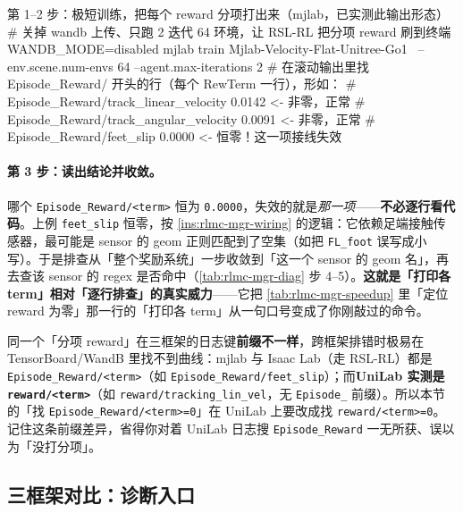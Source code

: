 \begin{codebox}[bash]{第 1--2 步：极短训练，把每个 reward 分项打出来（mjlab，已实测此输出形态）}
# 关掉 wandb 上传、只跑 2 迭代 64 环境，让 RSL-RL 把分项 reward 刷到终端
WANDB_MODE=disabled mjlab train Mjlab-Velocity-Flat-Unitree-Go1 \
    --env.scene.num-envs 64 --agent.max-iterations 2
# 在滚动输出里找 Episode_Reward/ 开头的行（每个 RewTerm 一行），形如：
#   Episode_Reward/track_linear_velocity   0.0142     <- 非零，正常
#   Episode_Reward/track_angular_velocity  0.0091     <- 非零，正常
#   Episode_Reward/feet_slip               0.0000     <- 恒零！这一项接线失效
\end{codebox}

\paragraph{第 3 步：读出结论并收敛。}哪个 \verb|Episode_Reward/<term>| 恒为 \verb|0.0000|，失效的就是\emph{那一项}——\textbf{不必逐行看代码}。上例 \verb|feet_slip| 恒零，按 \cref{ins:rlmc-mgr-wiring} 的逻辑：它依赖足端接触传感器，最可能是 sensor 的 geom 正则匹配到了空集（如把 \verb|FL_foot| 误写成小写）。于是排查从「整个奖励系统」一步收敛到「这一个 sensor 的 geom 名」，再去查该 sensor 的 regex 是否命中（\cref{tab:rlmc-mgr-diag} 步 4--5）。\textbf{这就是「打印各 term」相对「逐行排查」的真实威力}——它把 \cref{tab:rlmc-mgr-speedup} 里「定位 reward 为零」那一行的「打印各 term」从一句口号变成了你刚敲过的命令。

\begin{note}
同一个「分项 reward」在三框架的日志键\textbf{前缀不一样}，跨框架排错时极易在 TensorBoard/WandB 里找不到曲线：mjlab 与 Isaac Lab（走 RSL-RL）都是 \verb|Episode_Reward/<term>|（如 \verb|Episode_Reward/feet_slip|）；而\textbf{UniLab 实测是 \texttt{reward/<term>}}（如 \verb|reward/tracking_lin_vel|，无 \texttt{Episode\_} 前缀）。所以本节的「找 \verb|Episode_Reward/<term>=0|」在 UniLab 上要改成找 \verb|reward/<term>=0|。记住这条前缀差异，省得你对着 UniLab 日志搜 \verb|Episode_Reward| 一无所获、误以为「没打分项」。
\end{note}

\subsection{三框架对比：诊断入口}

